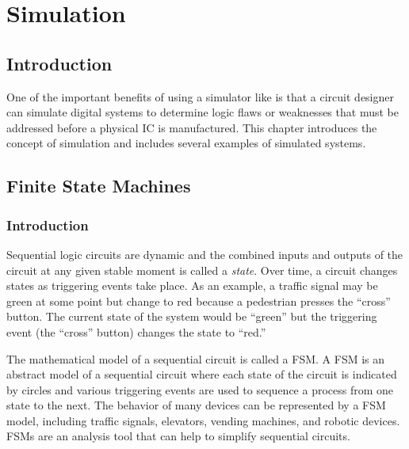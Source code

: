 \chapter{Simulation}\label{ch10}
\section{Introduction}

One of the important benefits of using a simulator like \Le is that a circuit designer can simulate digital systems to determine logic flaws or weaknesses that must be addressed before a physical \ac{IC} is manufactured. This chapter introduces the concept of simulation and includes several examples of simulated systems.

\section{Finite State Machines}
\label{SIM:sec:finite_state_machines}

\subsection{Introduction}
\label{SIM:subsec:intro_to_finite_state_machines}

Sequential logic circuits are dynamic and the combined inputs and outputs of the circuit at any given stable moment is called a \emph{state}. Over time, a circuit changes states as triggering events take place. As an example, a traffic signal may be green at some point but change to red because a pedestrian presses the  ``cross'' button. The current state of the system would be ``green'' but the triggering event (the ``cross'' button) changes the state to ``red.'' 

The mathematical model of a sequential circuit is called a \ac{FSM}. A \acl{FSM} is an abstract model of a sequential circuit where each state of the circuit is indicated by circles and various triggering events are used to sequence a process from one state to the next. The behavior of many devices can be represented by a \acl{FSM} model, including traffic signals, elevators, vending machines, and robotic devices. \aclp{FSM} are an analysis tool that can help to simplify sequential circuits. 

